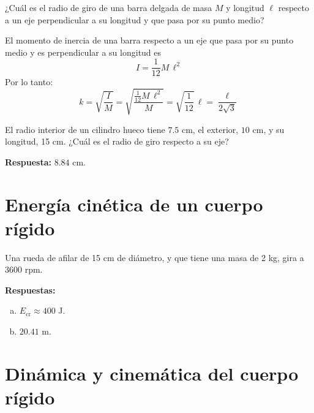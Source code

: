 \documentclass[addpoints]{exam}
\newcommand{\rta}{\textbf{Respuesta: }}
\newcommand{\rtas}{\textbf{Respuestas: }}
\begin{document}
\begin{questions}
    \question ¿Cuál es el radio de giro de una barra delgada de masa $M$ y longitud $\ell$ respecto a un eje perpendicular a su longitud y que pasa por su punto medio?

    \begin{solution}
    El momento de inercia de una barra respecto a un eje que pasa por su punto medio y es perpendicular a su longitud es $$I = \frac{1}{12} M \, \ell^2$$ Por lo tanto:
    \begin{equation*}
        k = \sqrt{\frac{I}{M}} = \sqrt{\frac{\frac{1}{12} M \, \ell^2}{M}} = \sqrt{\frac{1}{12}} \, \ell = \frac{\ell}{2 \sqrt{3}}
    \end{equation*}
    \end{solution}

    \question El radio interior de un cilindro hueco tiene $7.5$ cm, el exterior, $10$ cm, y su longitud, 15 cm. ¿Cuál es el radio de giro respecto a su eje?

    \rta $8.84$ cm.

    \section{Energía cinética de un cuerpo rígido}

    \question Una rueda de afilar de 15 cm de diámetro, y que tiene una masa de 2 kg, gira a 3600 rpm.

    \rtas
    \begin{enumerate}[(a)]
        \item $E_\text{cr} \approx 400$ J.
        \item $20.41$ m.
    \end{enumerate}

    \section{Dinámica y cinemática del cuerpo rígido}


\end{questions}
\end{document}
